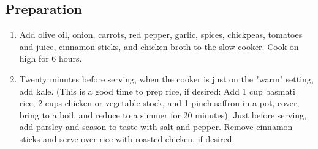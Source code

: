 \subsection{Preparation}
\begin{enumerate}
    \item Add olive oil, onion, carrots, red pepper, garlic, spices, chickpeas, tomatoes and juice, cinnamon sticks, and chicken broth to the slow cooker. Cook on high for 6 hours.
    \item Twenty minutes before serving, when the cooker is just on the "warm" setting, add kale. (This is a good time to prep rice, if desired: Add 1 cup basmati rice, 2 cups chicken or vegetable stock, and 1 pinch saffron in a pot, cover, bring to a boil, and reduce to a simmer for 20 minutes). Just before serving, add parsley and season to taste with salt and pepper. Remove cinnamon sticks and serve over rice with roasted chicken, if desired.
\end{enumerate}
